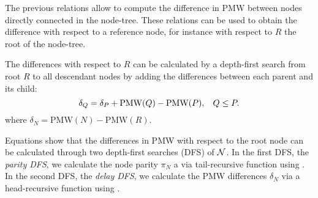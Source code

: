 The previous relations allow to compute the difference in PMW between nodes directly connected in the node-tree. These relations can be used to obtain the difference with respect to a reference node, for instance with respect to $R$ the root of the node-tree.

The differences with respect to $R$ can be calculated by a depth-first search from root $R$ to all descendant nodes by adding the differences between each parent and its child:
\begin{equation}\label{eq:pseudodelay}
    {\delta}_Q = {\delta}_P + \text{PMW}(Q) - \text{PMW}(P), \hspace{.3cm} Q\leq P.
\end{equation}
where ${\delta}_N = \text{PMW}(N) - \text{PMW}(R)$. 


Equations  show that the differences in PMW with respect to the root node can be calculated through two depth-first searches (DFS) of $\mathcal{N}$. In the first DFS, the \emph{parity DFS}, we calculate the node parity $\pi_N$ a via tail-recursive function using . In the second DFS, the \emph{delay DFS}, we calculate the PMW differences $\delta_N$ via a head-recursive function using . 

